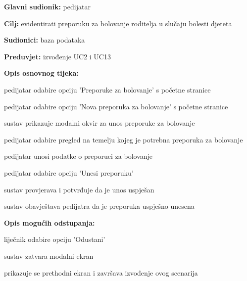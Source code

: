                     \noindent {}
					\begin{packed_item}
	
						\item \textbf{Glavni sudionik: }pedijatar
						\item  \textbf{Cilj:} evidentirati preporuku za bolovanje roditelja u slučaju bolesti djeteta
						\item  \textbf{Sudionici:} baza podataka
						\item  \textbf{Preduvjet:} izvođenje UC2 i UC13
						\item  \textbf{Opis osnovnog tijeka:}
						
						\item[] \begin{packed_enum}
							\item pedijatar odabire opciju 'Preporuke za bolovanje' s početne stranice
							\item pedijatar odabire opciju 'Nova preporuka za bolovanje' s početne stranice
							\item sustav prikazuje modalni okvir za unos preporuke za bolovanje
							\item pedijatar odabire pregled na temelju kojeg je potrebna preporuka za bolovanje
							\item pedijatar unosi podatke o preporuci za bolovanje
							\item pedijatar odabire opciju 'Unesi preporuku'
							\item sustav provjerava i potvrđuje da je unos uspješan
							\item sustav obavještava pedijatra da je preporuka uspješno unesena
				
						\end{packed_enum}
						\item  \textbf{Opis mogućih odstupanja:}
						
						\item[] \begin{packed_item}
	
							\item[6.a] liječnik odabire opciju 'Odustani'
							\item [] \begin{packed_enum}
								\item sustav zatvara modalni ekran
								\item prikazuje se prethodni ekran i završava izvođenje ovog scenarija
							\end{packed_enum}
						\end{packed_item}
                    \end{packed_item}
						
